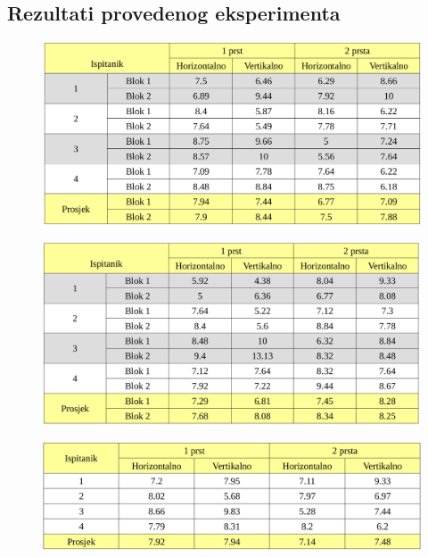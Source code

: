 \documentclass[times, utf8, zavrsni, numeric]{fer}
\begin{document}
\newpage

\begin{appendices}
\chapter{Rezultati provedenog eksperimenta}
\label{dod:implementacija}

\begin{figure}[htb]
\centering
\includegraphics[width=12cm]{img/furykey1_sve.png}
\label{tab:furykey1_sve}
\end{figure}

\begin{figure}[htb]
\centering
\includegraphics[width=12cm]{img/furykey2_sve.png}
\label{tab:furykey2_sve}
\end{figure}

\begin{figure}[htb]
\centering
\includegraphics[width=12cm]{img/furykey1_prosjek.png}
\label{tab:furykey1_avg}
\end{figure}


\end{appendices}
\end{document}
